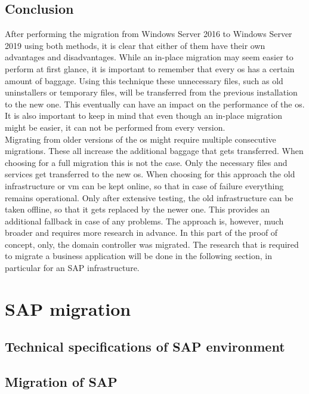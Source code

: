 \subsection{Conclusion}
After performing the migration from Windows Server 2016 to Windows Server 2019 using both methods, it is clear that either of them have their own advantages and disadvantages. While an in-place migration may seem easier to perform at first glance, it is important to remember that every \acrshort{os} has a certain amount of baggage. Using this technique these unnecessary files, such as old uninstallers or temporary files, will be transferred from the previous installation to the new one. This eventually can have an impact on the performance of the \acrshort{os}. It is also important to keep in mind that even though an in-place migration might be easier, it can not be performed from every version.
\\
Migrating from older versions of the \acrshort{os} might require multiple consecutive migrations. These all increase the additional baggage that gets transferred. When choosing for a full migration this is not the case. Only the necessary files and services get transferred to the new \acrshort{os}. When choosing for this approach the old infrastructure or \acrshort{vm} can be kept online, so that in case of failure everything remains operational. Only after extensive testing, the old infrastructure can be taken offline, so that it gets replaced by the newer one. This provides an additional fallback in case of any problems. The approach is, however, much broader and requires more research in advance. In this part of the proof of concept, only, the domain controller was migrated. The research that is required to migrate a business application will be done in the following section, in particular for an SAP infrastructure. 
\clearpage

\section{SAP migration}
\subsection{Technical specifications of SAP environment}
\subsection{Migration of SAP}
\clearpage

